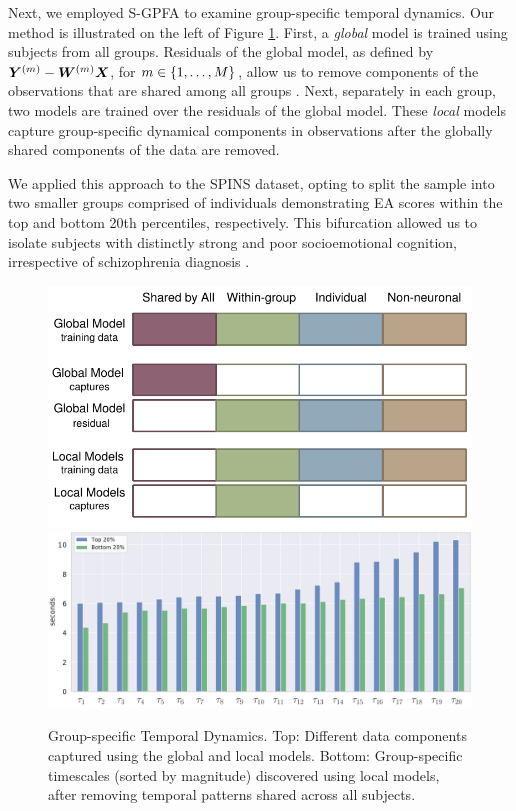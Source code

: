 Next, we employed S-GPFA to examine group-specific temporal dynamics. Our method is illustrated on the left of Figure \ref{ch1:fig:gtd}. First, a \textit{global} model is trained using subjects from all groups. Residuals of the global model, as defined by $\bm{Y}^{(m)} - \bm{W}^{(m)} \bm{X}$, for $m \in \{1, \ldots, M \}$, allow us to remove components of the observations that are shared among all groups \cite{srm}. Next, separately in each group, two models are trained over the residuals of the global model. These \textit{local} models capture group-specific dynamical components in observations after the globally shared components of the data are removed. 

We applied this approach to the SPINS dataset, opting to split the sample into two smaller groups comprised of individuals demonstrating EA scores within the top and bottom 20th percentiles, respectively. This bifurcation allowed us to isolate subjects with distinctly strong and poor socioemotional cognition, irrespective of schizophrenia diagnosis \cite{insel2014nimh}.

\begin{figure}[b!]
    \centering
    \includegraphics[width=.55\linewidth]{figs/ch1/group_tf_schematic_2.pdf}
    \includegraphics[width=1\linewidth]{figs/ch1/group_td.pdf}
    \vspace{-1em}
    \caption{Group-specific Temporal Dynamics. Top: Different data components captured using the global and local models. Bottom: Group-specific timescales (sorted by magnitude) discovered using local models, after removing temporal patterns shared across all subjects.}\label{ch1:fig:gtd}
\end{figure}

